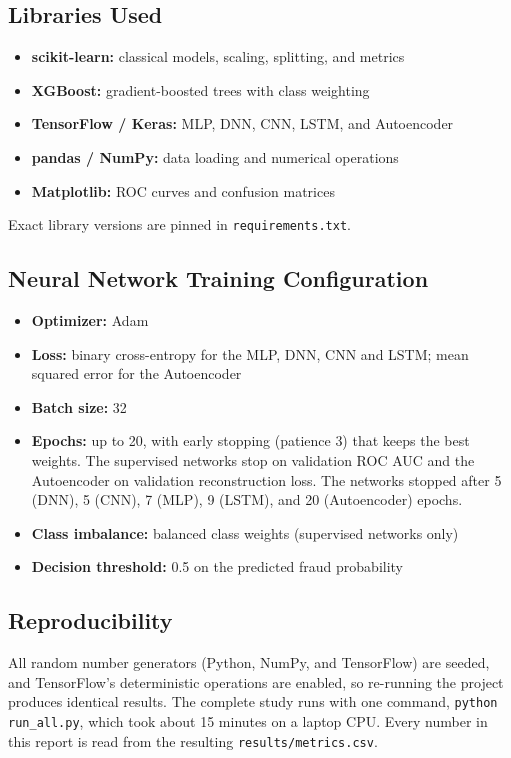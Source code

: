 \documentclass[journal]{IEEEtran}
\begin{document}
\subsection{Libraries Used}
\begin{itemize}
  \item \textbf{scikit-learn:} classical models, scaling, splitting, and metrics
  \item \textbf{XGBoost:} gradient-boosted trees with class weighting
  \item \textbf{TensorFlow / Keras:} MLP, DNN, CNN, LSTM, and Autoencoder
  \item \textbf{pandas / NumPy:} data loading and numerical operations
  \item \textbf{Matplotlib:} ROC curves and confusion matrices
\end{itemize}
Exact library versions are pinned in \texttt{requirements.txt}.

\subsection{Neural Network Training Configuration}\label{sec:nncfg}
\begin{itemize}
  \item \textbf{Optimizer:} Adam
  \item \textbf{Loss:} binary cross-entropy for the MLP, DNN, CNN and LSTM; mean squared error for the Autoencoder
  \item \textbf{Batch size:} 32
  \item \textbf{Epochs:} up to 20, with early stopping (patience 3) that keeps the best weights. The supervised networks stop on validation ROC AUC and the Autoencoder on validation reconstruction loss. The networks stopped after 5 (DNN), 5 (CNN), 7 (MLP), 9 (LSTM), and 20 (Autoencoder) epochs.
  \item \textbf{Class imbalance:} balanced class weights (supervised networks only)
  \item \textbf{Decision threshold:} 0.5 on the predicted fraud probability
\end{itemize}

\subsection{Reproducibility}
All random number generators (Python, NumPy, and TensorFlow) are seeded, and TensorFlow's deterministic operations are enabled, so re-running the project produces identical results. The complete study runs with one command, \texttt{python run\_all.py}, which took about 15 minutes on a laptop CPU. Every number in this report is read from the resulting \texttt{results/metrics.csv}.
\end{document}
